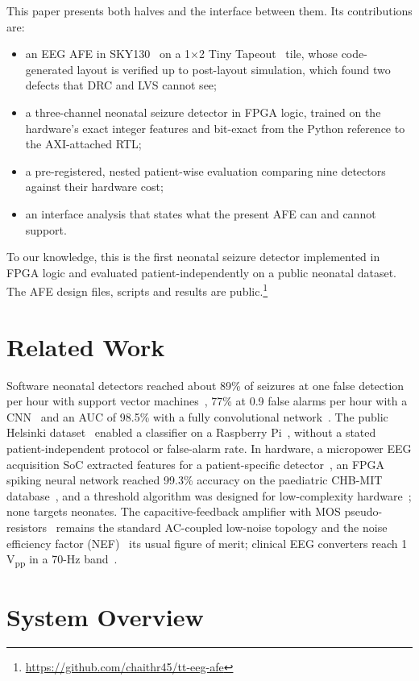 \documentclass[conference]{IEEEtran}
\newcommand{\uVpp}{\,\textmu V\textsubscript{pp}}
\begin{document}
This paper presents both halves and the interface between them. Its contributions are:
\begin{itemize}
\item an EEG AFE in SKY130~\cite{sky130} on a 1$\times$2 Tiny Tapeout~\cite{tinytapeout} tile, whose code-generated layout is verified up to post-layout simulation, which found two defects that DRC and LVS cannot see;
\item a three-channel neonatal seizure detector in FPGA logic, trained on the hardware's exact integer features and bit-exact from the Python reference to the AXI-attached RTL;
\item a pre-registered, nested patient-wise evaluation comparing nine detectors against their hardware cost;
\item an interface analysis that states what the present AFE can and cannot support.
\end{itemize}
To our knowledge, this is the first neonatal seizure detector implemented in FPGA logic and evaluated patient-independently on a public neonatal dataset. The AFE design files, scripts and results are public.\footnote{\url{https://github.com/chaithr45/tt-eeg-afe}}

\section{Related Work}

Software neonatal detectors reached about 89\% of seizures at one false detection per hour with support vector machines~\cite{temko2011}, 77\% at 0.9 false alarms per hour with a CNN~\cite{ansari2019} and an AUC of 98.5\% with a fully convolutional network~\cite{oshea2020}. The public Helsinki dataset~\cite{stevenson2019} enabled a classifier on a Raspberry Pi~\cite{nagarajan2021}, without a stated patient-independent protocol or false-alarm rate. In hardware, a micropower EEG acquisition SoC extracted features for a patient-specific detector~\cite{verma2010}, an FPGA spiking neural network reached 99.3\% accuracy on the paediatric CHB-MIT database~\cite{busia2025}, and a threshold algorithm was designed for low-complexity hardware~\cite{vittimberga2025}; none targets neonates. The capacitive-feedback amplifier with MOS pseudo-resistors~\cite{harrison2003} remains the standard AC-coupled low-noise topology and the noise efficiency factor (NEF)~\cite{steyaert1987} its usual figure of merit; clinical EEG converters reach 1\uVpp{} in a 70-Hz band~\cite{ads1299}.


\section{System Overview}
\end{document}
